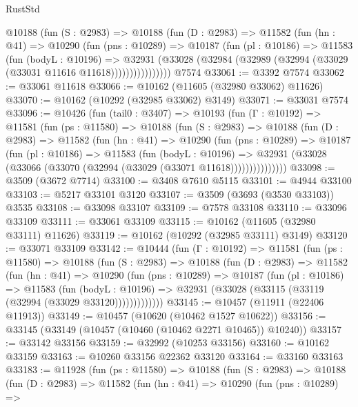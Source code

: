\begin{lexlean}{RustStd}
\begin{coremodule}
          @10188
            (fun (S : @2983) =>
            @10188
              (fun (D : @2983) =>
              @11582
                (fun (hn : @41) =>
                @10290
                  (fun (pns : @10289) =>
                  @10187
                    (fun (pl : @10186) =>
                    @11583
                      (fun (bodyL : @10196) =>
                      @32931
                        (@33028
                          (@32984 (@32989 (@32994 (@33029 (@33031 @11616 @11618))))))))))))))))
    @7574
@33061 := @3392 @7574
@33062 := @33061 @11618
@33066 := @10162 (@11605 (@32980 @33062) @11626)
@33070 := @10162 (@10292 (@32985 @33062) @3149)
@33071 := @33031 @7574
@33096 := @10426
    (fun (tail0 : @3407) =>
    @10193
      (fun (Γ : @10192) =>
      @11581
        (fun (ps : @11580) =>
        @10188
          (fun (S : @2983) =>
          @10188
            (fun (D : @2983) =>
            @11582
              (fun (hn : @41) =>
              @10290
                (fun (pns : @10289) =>
                @10187
                  (fun (pl : @10186) =>
                  @11583
                    (fun (bodyL : @10196) =>
                    @32931 (@33028 (@33066 (@33070 (@32994 (@33029 (@33071 @11618)))))))))))))))
@33098 := @3509 (@3672 @7714)
@33100 := @3408 @7610 @5115
@33101 := @4944 @33100
@33103 := @5217 @33101 @3120
@33107 := @3509 (@3693 (@3530 @33103)) @3535
@33108 := @33098 @33107
@33109 := @7578 @33108
@33110 := @33096 @33109
@33111 := @33061 @33109
@33115 := @10162 (@11605 (@32980 @33111) @11626)
@33119 := @10162 (@10292 (@32985 @33111) @3149)
@33120 := @33071 @33109
@33142 := @10444
    (fun (Γ : @10192) =>
    @11581
      (fun (ps : @11580) =>
      @10188
        (fun (S : @2983) =>
        @10188
          (fun (D : @2983) =>
          @11582
            (fun (hn : @41) =>
            @10290
              (fun (pns : @10289) =>
              @10187
                (fun (pl : @10186) =>
                @11583
                  (fun (bodyL : @10196) =>
                  @32931 (@33028 (@33115 (@33119 (@32994 (@33029 @33120)))))))))))))
@33145 := @10457 (@11911 (@22406 @11913))
@33149 := @10457 (@10620 (@10462 @1527 @10622))
@33156 := @33145 (@33149 (@10457 (@10460 (@10462 @2271 @10465)) @10240))
@33157 := @33142 @33156
@33159 := @32992 (@10253 @33156)
@33160 := @10162 @33159
@33163 := @10260 @33156 @22362 @33120
@33164 := @33160 @33163
@33183 := @11928
    (fun (ps : @11580) =>
    @10188
      (fun (S : @2983) =>
      @10188
        (fun (D : @2983) =>
        @11582
          (fun (hn : @41) =>
          @10290
            (fun (pns : @10289) =>

\end{coremodule}
\end{lexlean}
